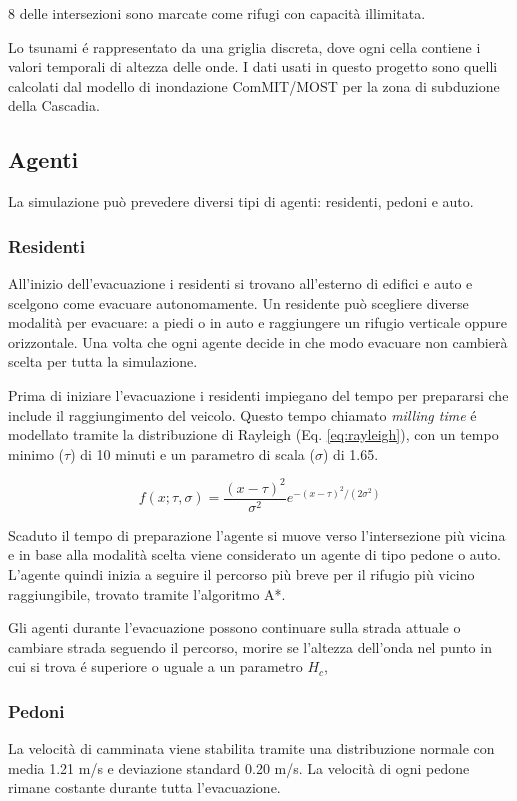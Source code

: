 8 delle intersezioni sono marcate come rifugi con capacità illimitata.

Lo tsunami é rappresentato da una griglia discreta, dove ogni cella contiene i valori temporali di altezza delle onde.
I dati usati in questo progetto sono quelli calcolati dal modello di inondazione ComMIT/MOST \parencite{titov1997implementation} per la zona di subduzione della Cascadia.


\subsection{Agenti}
La simulazione può prevedere diversi tipi di agenti: residenti, pedoni e auto.

\subsubsection{Residenti}
All'inizio dell'evacuazione i residenti si trovano all'esterno di edifici e auto
e scelgono come evacuare autonomamente.
Un residente può scegliere diverse modalità per evacuare: a piedi o in auto e raggiungere un rifugio verticale oppure orizzontale.
Una volta che ogni agente decide in che modo evacuare non cambierà scelta per tutta la simulazione.

Prima di iniziare l'evacuazione i residenti impiegano del tempo per prepararsi
che include il raggiungimento del veicolo.
%
Questo tempo chiamato \textit{milling time} é modellato tramite
la distribuzione di Rayleigh (Eq. \ref{eq:rayleigh}), con un tempo minimo ($\tau$) di 10 minuti
e un parametro di scala ($\sigma$) di 1.65.

\begin{equation}
  f(x; \tau, \sigma) = \frac{(x - \tau)^2}{\sigma^2}e^{-{(x - \tau)^2}/(2\sigma^2)}
  \label{eq:rayleigh}
\end{equation}

Scaduto il tempo di preparazione l'agente si muove verso l'intersezione più vicina e
in base alla modalità scelta viene considerato un agente di tipo pedone o auto.
L'agente quindi inizia a seguire il percorso più breve per il rifugio più vicino raggiungibile, trovato tramite l'algoritmo A*.

Gli agenti durante l'evacuazione possono continuare sulla strada attuale o cambiare strada seguendo il percorso,
morire se l'altezza dell'onda nel punto in cui si trova é superiore o uguale a un parametro $H_c$,

\subsubsection{Pedoni}
La velocità di camminata viene stabilita tramite una distribuzione normale
con media 1.21 m/s e deviazione standard 0.20 m/s.
La velocità di ogni pedone rimane costante durante tutta l'evacuazione.

